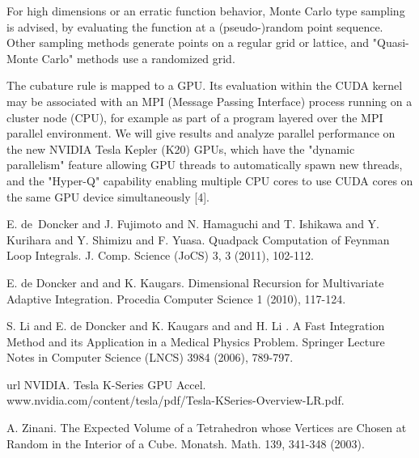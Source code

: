 \documentclass[article,A4,11pt]{llncs}%
\begin{document}
For high dimensions or an erratic function behavior, Monte Carlo type sampling is advised, by evaluating the function at a (pseudo-)random point sequence. Other sampling methods generate points on a regular grid or lattice, and "Quasi-Monte Carlo" methods use a randomized grid. 

The cubature rule is mapped to a GPU. Its evaluation within the CUDA kernel may be associated with an MPI (Message Passing Interface) process running on a cluster node (CPU), for example as part of a program layered over the MPI parallel environment. 
We will give results and analyze parallel performance on the new NVIDIA Tesla Kepler (K20) GPUs, which have the "dynamic parallelism" feature allowing GPU threads to automatically spawn new threads, and the "Hyper-Q" capability enabling multiple CPU cores to use CUDA cores on the same GPU device simultaneously [4].



\begin{thebibliography}{10}
{\sc E. de~Doncker and J. Fujimoto and N. Hamaguchi and T. Ishikawa and Y. Kurihara and Y. Shimizu and F. Yuasa}. {Quadpack Computation of Feynman Loop Integrals}. J. Comp. Science (JoCS) 3, 3 (2011), 102-112.

{\sc E. de Doncker and and K. Kaugars}. {Dimensional Recursion for Multivariate Adaptive Integration}. Procedia Computer Science 1 (2010), 117-124.

{\sc S. Li and E. de Doncker and K. Kaugars and and H. Li }. {A Fast Integration Method and its Application in a Medical Physics Problem}. Springer Lecture Notes in Computer Science (LNCS) 3984 (2006), 789-797.

{\sc url NVIDIA}. {Tesla K-Series GPU Accel}. www.nvidia.com/content/tesla/pdf/Tesla-KSeries-Overview-LR.pdf.

{\sc A. Zinani}. {The Expected Volume of a Tetrahedron whose Vertices are Chosen at Random in the Interior of a Cube}. Monatsh. Math. 139, 341-348 (2003).
\end{thebibliography}
\end{document}
